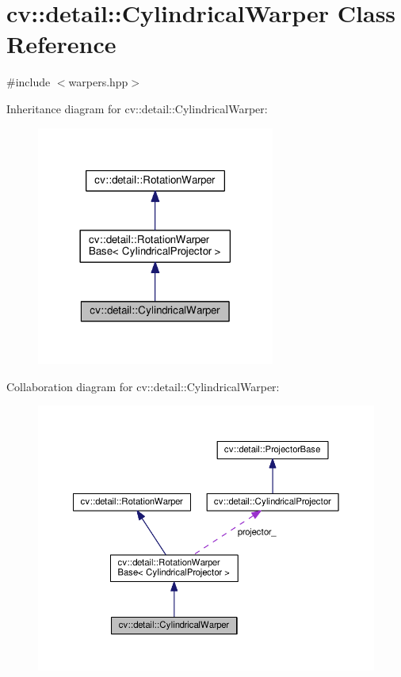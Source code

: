 \hypertarget{classcv_1_1detail_1_1CylindricalWarper}{\section{cv\-:\-:detail\-:\-:Cylindrical\-Warper Class Reference}
\label{classcv_1_1detail_1_1CylindricalWarper}
}


{\ttfamily \#include $<$warpers.\-hpp$>$}



Inheritance diagram for cv\-:\-:detail\-:\-:Cylindrical\-Warper\-:\nopagebreak
\begin{figure}[H]
\begin{center}
\leavevmode
\includegraphics[width=222pt]{classcv_1_1detail_1_1CylindricalWarper__inherit__graph}
\end{center}
\end{figure}


Collaboration diagram for cv\-:\-:detail\-:\-:Cylindrical\-Warper\-:\nopagebreak
\begin{figure}[H]
\begin{center}
\leavevmode
\includegraphics[width=350pt]{classcv_1_1detail_1_1CylindricalWarper__coll__graph}
\end{center}
\end{figure}
